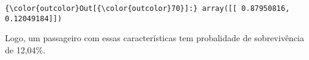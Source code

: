 \documentclass[11pt]{article}
\begin{document}
\begin{Verbatim}[commandchars=\\\{\}]
{\color{outcolor}Out[{\color{outcolor}70}]:} array([[ 0.87950816,  0.12049184]])
\end{Verbatim}
            
    Logo, um passageiro com essas características tem probalidade de
sobrevivência de 12,04\%.


    
    
    
    
\end{document}
